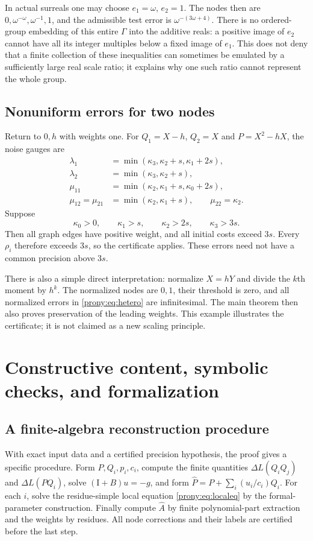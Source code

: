 \documentclass[11pt,letterpaper]{article}
\theoremstyle{definition}
\theoremstyle{remark}
\newcommand{\Ph}{\widehat P}
\newcommand{\Ah}{\widehat A}
\newcommand{\Id}{\mathrm I}
\begin{document}
In actual surreals one may choose $e_1=\omega$, $e_2=1$. The nodes then
are $0,\omega^{-\omega},\omega^{-1},1$, and the admissible test error is
$\omega^{-(3\omega+4)}$. There is no ordered-group embedding of this entire
$\Gamma$ into the additive reals: a positive image of $e_2$ cannot have
all its integer multiples below a fixed image of $e_1$. This does not deny
that a finite collection of these inequalities can sometimes be emulated
by a sufficiently large real scale ratio; it explains why one such ratio
cannot represent the whole group.

\subsection{Nonuniform errors for two nodes}
Return to $0,h$ with weights one. For $Q_1=X-h$, $Q_2=X$ and
$P=X^2-hX$, the noise gauges are
\begin{align*}
 \lambda_1&=\min(\kappa_3,\kappa_2+s,\kappa_1+2s),\\
 \lambda_2&=\min(\kappa_3,\kappa_2+s),\\
 \mu_{11}&=\min(\kappa_2,\kappa_1+s,\kappa_0+2s),\\
 \mu_{12}=\mu_{21}&=\min(\kappa_2,\kappa_1+s),\qquad
 \mu_{22}=\kappa_2.
\end{align*}
Suppose
\begin{equation}\label{prony:eq:hetero}
 \kappa_0>0,\qquad\kappa_1>s,\qquad
 \kappa_2>2s,\qquad\kappa_3>3s.
\end{equation}
Then all graph edges have positive weight, and all initial costs exceed
$3s$. Every $\rho_i$ therefore exceeds $3s$, so the certificate applies.
These errors need not have a common precision above $3s$.

There is also a simple direct interpretation: normalize $X=hY$ and divide
the $k$th moment by $h^k$. The normalized nodes are $0,1$, their threshold
is zero, and all normalized errors in \eqref{prony:eq:hetero} are infinitesimal.
The main theorem then also proves preservation of the leading weights.
This example illustrates the certificate; it is not claimed as a new
scaling principle.

\section{Constructive content, symbolic checks, and formalization}
\label{prony:sec:verification}

\subsection{A finite-algebra reconstruction procedure}
With exact input data and a certified precision hypothesis, the proof gives
a specific procedure. Form $P,Q_i,p_i,c_i$, compute the finite quantities
$\Delta L(Q_iQ_j)$ and $\Delta L(PQ_i)$, solve
$(\Id+B)u=-g$, and form $\Ph=P+\sum_i(u_i/c_i)Q_i$.
For each $i$, solve the residue-simple local equation
\eqref{prony:eq:localeq} by the formal-parameter construction. Finally compute
$\Ah$ by finite polynomial-part extraction and the weights by residues.
All node corrections and their labels are certified before the last step.
\end{document}
